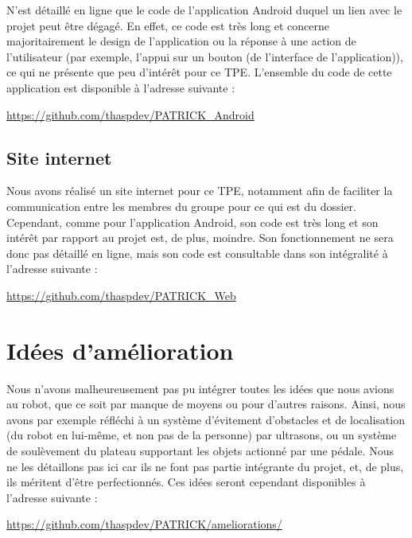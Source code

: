 \documentclass[12pt,a4paper]{article}
\begin{document}
N'est détaillé en ligne que le code de l'application Android duquel un lien avec le projet peut être dégagé. En effet, ce code est très long et concerne majoritairement le design de l'application ou la réponse à une action de l'utilisateur (par exemple, l'appui sur un bouton (de l'interface de l'application)), ce qui ne présente que peu d'intérêt pour ce TPE. L'ensemble du code de cette application est disponible à l'adresse suivante \nolinebreak:

\begin{center}
	\url{https://github.com/thaspdev/PATRICK_Android}
\end{center}

\subsection{Site internet}

\indent\indent Nous avons réalisé un site internet pour ce TPE, notamment afin de faciliter la communication entre les membres du groupe pour ce qui est du dossier. Cependant, comme pour l'application Android, son code est très long et son intérêt par rapport au projet est, de plus, moindre. Son fonctionnement ne sera donc pas détaillé en ligne, mais son code est consultable dans son intégralité à l'adresse suivante :
	
	\begin{center}
	\url{https://github.com/thaspdev/PATRICK_Web}
	\end{center}
	\newpage
	\section{Idées d'amélioration}
	
	\indent\indent Nous n'avons malheureusement pas pu intégrer toutes les idées que nous avions au robot, que ce soit par manque de moyens ou pour d'autres raisons. Ainsi, nous avons par exemple réfléchi à un système d'évitement d'obstacles et de localisation (du robot en lui-même, et non pas de la personne) par ultrasons, ou un système de soulèvement du plateau supportant les objets actionné par une pédale. Nous ne les détaillons pas ici car ils ne font pas partie intégrante du projet, et, de plus, ils méritent d'être perfectionnés. Ces idées seront cependant disponibles à l'adresse suivante :
	
\begin{center}
	\url{https://github.com/thaspdev/PATRICK/ameliorations/}
\end{center}
	\newpage
\end{document}
